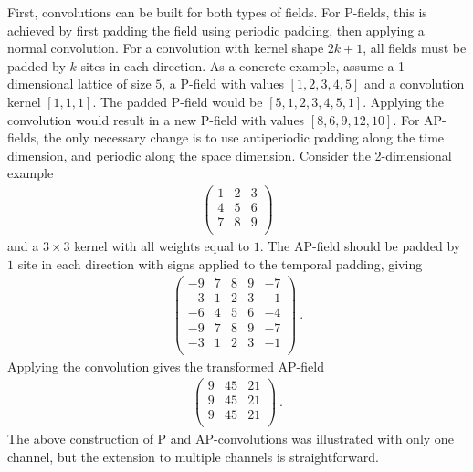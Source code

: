 \documentclass[aps,prd,twocolumn,nofootinbib,superscriptaddress,preprintnumbers]{revtex4-1}
\begin{document}
First, convolutions can be built for both types of fields. For P-fields, this is achieved by first padding the field using periodic padding, then applying a normal convolution. For a convolution with kernel shape $2k+1$, all fields must be padded by $k$ sites in each direction. As a concrete example, assume a 1-dimensional lattice of size $5$, a P-field with values $[1, 2, 3, 4, 5]$ and a convolution kernel $[1, 1, 1]$. The padded P-field would be $[5, 1, 2, 3, 4, 5, 1]$. Applying the convolution would result in a new P-field with values $[8, 6, 9, 12, 10]$. For AP-fields, the only necessary change is to use antiperiodic padding along the time dimension, and periodic along the space dimension. Consider the 2-dimensional example
%
\begin{equation}
\begin{aligned}
    \begin{pmatrix}
    1 & 2 & 3 \\
    4 & 5 & 6 \\
    7 & 8 & 9 \\
    \end{pmatrix}
\end{aligned}
\end{equation}
%
and a $3\times 3$ kernel with all weights equal to $1$. The AP-field should be padded by $1$ site in each direction with signs applied to the temporal padding, giving
%
\begin{equation}
\begin{aligned}
    \begin{pmatrix}
    -9 & 7 & 8 & 9 & -7 \\
    -3 & 1 & 2 & 3 & -1 \\
    -6 & 4 & 5 & 6 & -4 \\
    -9 & 7 & 8 & 9 & -7 \\
    -3 & 1 & 2 & 3 & -1 \\
    \end{pmatrix} \ .
\end{aligned}
\end{equation}
%
Applying the convolution gives the transformed AP-field
%
\begin{equation}
\begin{aligned}
    \begin{pmatrix}
    9 & 45 & 21 \\
    9 & 45 & 21 \\
    9 & 45 & 21 \\
    \end{pmatrix} \ .
\end{aligned}
\end{equation}
%
The above construction of P and AP-convolutions was illustrated with only one channel, but the extension to multiple channels is straightforward.
\end{document}
